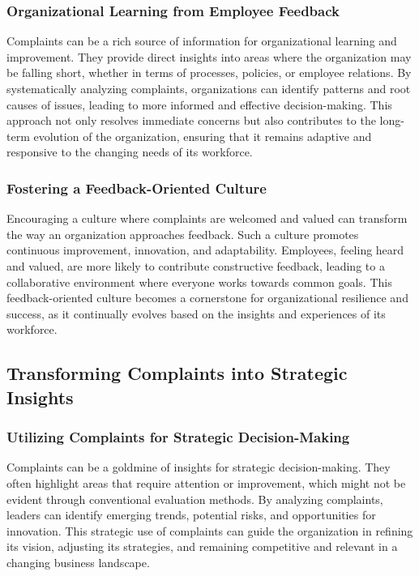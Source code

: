 \documentclass[runningheads]{llncs}
\begin{document}
\subsubsection{Organizational Learning from Employee Feedback}
Complaints can be a rich source of information for organizational learning and improvement. They provide direct insights into areas where the organization may be falling short, whether in terms of processes, policies, or employee relations. By systematically analyzing complaints, organizations can identify patterns and root causes of issues, leading to more informed and effective decision-making. This approach not only resolves immediate concerns but also contributes to the long-term evolution of the organization, ensuring that it remains adaptive and responsive to the changing needs of its workforce.

\subsubsection{Fostering a Feedback-Oriented Culture}
Encouraging a culture where complaints are welcomed and valued can transform the way an organization approaches feedback. Such a culture promotes continuous improvement, innovation, and adaptability. Employees, feeling heard and valued, are more likely to contribute constructive feedback, leading to a collaborative environment where everyone works towards common goals. This feedback-oriented culture becomes a cornerstone for organizational resilience and success, as it continually evolves based on the insights and experiences of its workforce.

\subsection{Transforming Complaints into Strategic Insights}
\subsubsection{Utilizing Complaints for Strategic Decision-Making}
Complaints can be a goldmine of insights for strategic decision-making. They often highlight areas that require attention or improvement, which might not be evident through conventional evaluation methods. By analyzing complaints, leaders can identify emerging trends, potential risks, and opportunities for innovation. This strategic use of complaints can guide the organization in refining its vision, adjusting its strategies, and remaining competitive and relevant in a changing business landscape.
\end{document}
